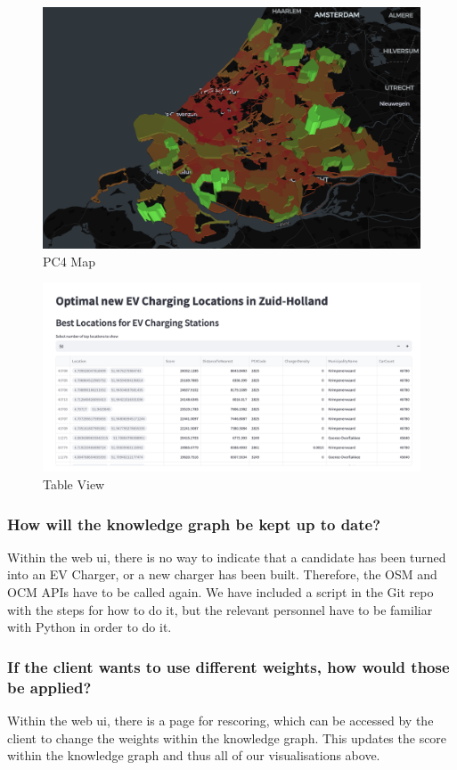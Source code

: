 \documentclass{article}
\newcommand{\question}[1]{#1}
\begin{document}
\begin{figure}[H]
	\centering
	\includegraphics[width=0.75\linewidth]{pc4_map_view.png}
	\caption{PC4 Map}
	\label{fig:pc4}
\end{figure}

\begin{figure}[H]
	\centering
	\includegraphics[width=0.75\linewidth]{table_view.png}
	\caption{Table View}
	\label{fig:table_view}
\end{figure}

\question{\subsubsection*{How will the knowledge graph be kept up to date?}}
Within the web ui, there is no way to indicate that a candidate has been turned into an EV Charger, or a new charger has been built. Therefore, the OSM and OCM APIs have to be called again. We have included a script in the Git repo with the steps for how to do it, but the relevant personnel have to be familiar with Python in order to do it.

\question{\subsubsection*{If the client wants to use different weights, how would those be applied?}}
Within the web ui, there is a page for rescoring, which can be accessed by the client to change the weights within the knowledge graph. This updates the score within the knowledge graph and thus all of our visualisations above.
\end{document}
